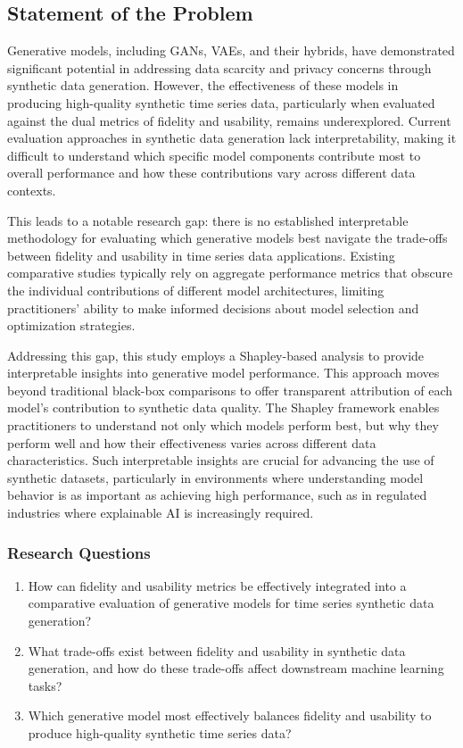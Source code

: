 \documentclass{article}
\begin{document}
\subsection{Statement of the Problem}

Generative models, including GANs, VAEs, and their hybrids, have demonstrated significant potential in addressing data scarcity and privacy concerns through synthetic data generation. However, the effectiveness of these models in producing high-quality synthetic time series data, particularly when evaluated against the dual metrics of fidelity and usability, remains underexplored. Current evaluation approaches in synthetic data generation lack interpretability, making it difficult to understand which specific model components contribute most to overall performance and how these contributions vary across different data contexts.

This leads to a notable research gap: there is no established interpretable methodology for evaluating which generative models best navigate the trade-offs between fidelity and usability in time series data applications. Existing comparative studies typically rely on aggregate performance metrics that obscure the individual contributions of different model architectures, limiting practitioners' ability to make informed decisions about model selection and optimization strategies.

Addressing this gap, this study employs a Shapley-based analysis to provide interpretable insights into generative model performance. This approach moves beyond traditional black-box comparisons to offer transparent attribution of each model's contribution to synthetic data quality. The Shapley framework enables practitioners to understand not only which models perform best, but why they perform well and how their effectiveness varies across different data characteristics. Such interpretable insights are crucial for advancing the use of synthetic datasets, particularly in environments where understanding model behavior is as important as achieving high performance, such as in regulated industries where explainable AI is increasingly required.

\subsubsection{Research Questions}
\begin{enumerate}
    \item How can fidelity and usability metrics be effectively integrated into a comparative evaluation of generative models for time series synthetic data generation?
    \item What trade-offs exist between fidelity and usability in synthetic data generation, and how do these trade-offs affect downstream machine learning tasks?
    \item Which generative model most effectively balances fidelity and usability to produce high-quality synthetic time series data?
\end{enumerate}
\end{document}
